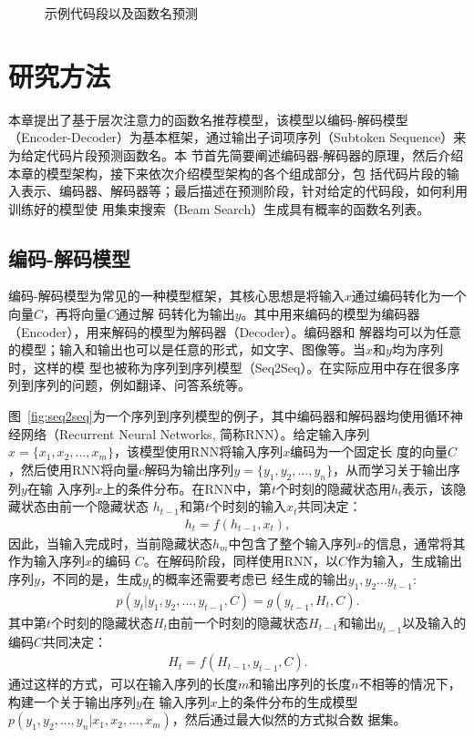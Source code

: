\begin{figure}
\centering
{}
\hfill
{}
\caption{示例代码段以及函数名预测}
\label{stop}
\end{figure}

\section{研究方法}
本章提出了基于层次注意力的函数名推荐模型，该模型以编码-解码模型~\cite{Kyunghyun2014Learning}
（Encoder-Decoder）为基本框架，通过输出子词项序列（Subtoken Sequence）来为给定代码片段预测函数名。本
节首先简要阐述编码器-解码器的原理，然后介绍本章的模型架构，接下来依次介绍模型架构的各个组成部分，包
括代码片段的输入表示、编码器、解码器等；最后描述在预测阶段，针对给定的代码段，如何利用训练好的模型使
用集束搜索（Beam Search）生成具有概率的函数名列表。

\subsection{编码-解码模型}
编码-解码模型为常见的一种模型框架，其核心思想是将输入$x$通过编码转化为一个向量$C$，再将向量$C$通过解
码转化为输出$y$。其中用来编码的模型为编码器（Encoder），用来解码的模型为解码器（Decoder）。编码器和
解器均可以为任意的模型；输入和输出也可以是任意的形式，如文字、图像等。当$x$和$y$均为序列时，这样的模
型也被称为序列到序列模型（Seq2Seq）。在实际应用中存在很多序列到序列的问题，例如翻译、问答系统等。

图~\ref{fig:seq2seq}为一个序列到序列模型的例子，其中编码器和解码器均使用循环神经网络（Recurrent Neural
Networks, 简称RNN）。给定输入序列$x=\{x_1,x_2,...,x_m\}$，该模型使用RNN将输入序列$x$编码为一个固定长
度的向量$C$，然后使用RNN将向量$c$解码为输出序列$y=\{y_1,y_2,...,y_n\}$，从而学习关于输出序列$y$在输
入序列$x$上的条件分布。在RNN中，第$t$个时刻的隐藏状态用$h_t$表示，该隐藏状态由前一个隐藏状态
$h_{t-1}$和第$t$个时刻的输入$x_t$共同决定：
\begin{eqnarray}
    h_t = f(h_{t-1},x_t),
\end{eqnarray}
因此，当输入完成时，当前隐藏状态$h_m$中包含了整个输入序列$x$的信息，通常将其作为输入序列$x$的编码
$C$。在解码阶段，同样使用RNN，以$C$作为输入，生成输出序列$y$，不同的是，生成$y_t$的概率还需要考虑已
经生成的输出$y_1,y_2...y_{t-1}$:
\begin{eqnarray}
    p(y_t|y_1,y_2,...,y_{t-1},C) = g(y_{t-1},H_t,C).
\end{eqnarray}
其中第$t$个时刻的隐藏状态$H_t$由前一个时刻的隐藏状态$H_{t-1}$和输出$y_{t-1}$以及输入的编码$C$共同决定：
\begin{eqnarray}
    H_t = f(H_{t-1},y_{t-1},C).
\end{eqnarray}
通过这样的方式，可以在输入序列的长度$m$和输出序列的长度$n$不相等的情况下，构建一个关于输出序列$y$在
输入序列$x$上的条件分布的生成模型$p(y_1,y_2,...,y_n|x_1,x_2,...,x_m)$，然后通过最大似然的方式拟合数
据集。

